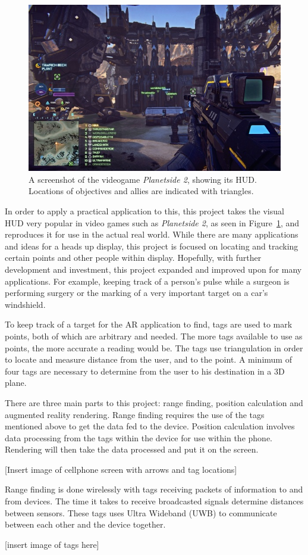 \begin{figure}
	\centering
	\includegraphics[width=\linewidth]{Figures/GameHUD.jpg}
	\decoRule
	\caption{A screenshot of the videogame \emph{Planetside 2}, showing its HUD. Locations of objectives and allies are indicated with triangles.}
	\label{fig:GameHUD}
\end{figure}

In order to apply a practical application to this, this project takes the visual HUD very popular in video games such as \emph{Planetside 2}, as seen in Figure~\ref{fig:GameHUD}, and reproduces it for use in the actual real world.  While there are many applications and ideas for a heads up display, this project is focused on locating and tracking certain points and other people within display. Hopefully, with further development and investment, this project expanded and improved upon for many applications. For example, keeping track of a person’s pulse while a surgeon is performing surgery or the marking of a very important target on a car’s windshield.

To keep track of a target for the AR application to find, tags are used to mark points, both of which are arbitrary and needed. The more tags available to use as points, the more accurate a reading would be. The tags use triangulation in order to locate and measure distance from the user, and to the point. A minimum of four tags are necessary to determine from the user to his destination in a 3D plane.

There are three main parts to this project: range finding, position calculation and augmented reality rendering. Range finding requires the use of the tags mentioned above to get the data fed to the device. Position calculation involves data processing from the tags within the device for use within the phone. Rendering will then take the data processed and put it on the screen.

[Insert image of cellphone screen with arrows and tag locations]

Range finding is done wirelessly with tags receiving packets of information to and from devices. The time it takes to receive broadcasted signals determine distances between sensors. These tags uses Ultra Wideband (UWB) to communicate between each other and the device together.

[insert image of tags here]
